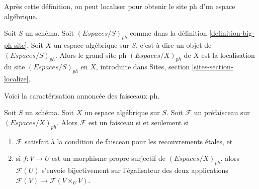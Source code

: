 \noindent
Après cette définition, on peut localiser pour obtenir le site ph
d'un espace algébrique.

\begin{definition}
\label{definition-big-small-ph}
Soit $S$ un schéma. Soit $(\textit{Espaces}/S)_{ph}$ comme dans la
définition \ref{definition-big-ph-site}.
Soit $X$ un espace algébrique sur $S$, c'est-à-dire un objet de
$(\textit{Espaces}/S)_{ph}$. Alors le grand site ph
{\it $(\textit{Espaces}/X)_{ph}$} de $X$
est la localisation du site $(\textit{Espaces}/S)_{ph}$
en $X$, introduite dans Sites, section \ref{sites-section-localize}.
\end{definition}

\noindent
Voici la caractérisation annoncée des faisceaux ph.

\begin{lemma}
\label{lemma-characterize-sheaf}
Soit $S$ un schéma. Soit $X$ un espace algébrique sur $S$.
Soit $\mathcal{F}$ un préfaisceau sur $(\textit{Espaces}/X)_{ph}$.
Alors $\mathcal{F}$ est un faisceau si et seulement si
\begin{enumerate}
\item $\mathcal{F}$ satisfait à la condition de faisceau pour les recouvrements \'etales, et
\item si $f : V \to U$ est un morphisme propre surjectif de
$(\textit{Espaces}/X)_{ph}$, alors
$\mathcal{F}(U)$ s'envoie bijectivement sur l'égalisateur
des deux applications $\mathcal{F}(V) \to \mathcal{F}(V \times_U V)$.
\end{enumerate}
\end{lemma}

